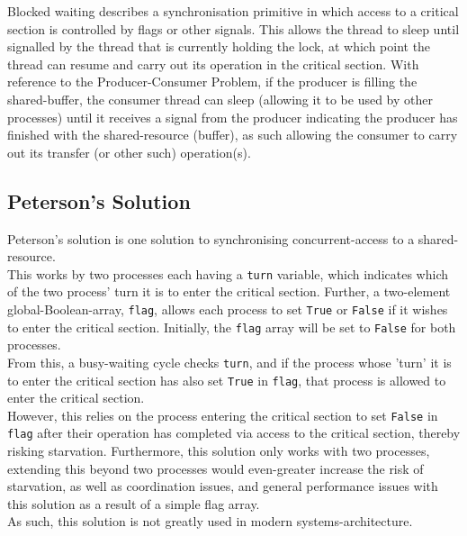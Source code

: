 Blocked waiting describes a synchronisation primitive in which access to a critical section is controlled by flags or other signals. This allows the thread to sleep until signalled by the thread that is currently holding the lock, at which point the thread can resume and carry out its operation in the critical section. With reference to the Producer-Consumer Problem, if the producer is filling the shared-buffer, the consumer thread can sleep (allowing it to be used by other processes) until it receives a signal from the producer indicating the producer has finished with the shared-resource (buffer), as such allowing the consumer to carry out its transfer (or other such) operation(s).

\subsection{Peterson's Solution}
Peterson's solution is one solution to synchronising concurrent-access to a shared-resource.\\
This works by two processes each having a \texttt{turn} variable, which indicates which of the two process' turn it is to enter the critical section.
Further, a two-element global-Boolean-array, \texttt{flag}, allows each process to set \texttt{True} or \texttt{False} if it wishes to enter the critical section. Initially, the \texttt{flag} array will be set to \texttt{False} for both processes.\\
From this, a busy-waiting cycle checks \texttt{turn}, and if the process whose 'turn' it is to enter the critical section has also set \texttt{True} in \texttt{flag}, that process is allowed to enter the critical section.\\
However, this relies on the process entering the critical section to set \texttt{False} in \texttt{flag} after their operation has completed via access to the critical section, thereby risking starvation.
Furthermore, this solution only works with two processes, extending this beyond two processes would even-greater increase the risk of starvation, as well as coordination issues, and general performance issues with this solution as a result of a simple flag array.\\
As such, this solution is not greatly used in modern systems-architecture.

